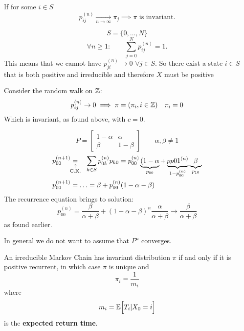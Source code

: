 \documentclass{article}
\begin{document}
\begin{proposition}
    If for some $i\in S$ \[
    p_{ij}^{(n)}\xrightarrow[n\rightarrow\infty]{}\pi_j\implies\pi\text{ is invariant.}
    \]
\end{proposition}
    \begin{proof2}
        \[S=\{0,\ldots,N\}\]
        \[\forall n\geqslant1:\qquad\sum_{j=0}^N p_{ij}^{(n)}=1. \]
        This means that we cannot have $p_{ji}^{(n)}\rightarrow 0$ $\forall j\in S$. So there exist a state $i \in S$ that is both positive and irreducible and therefore $X$ must be positive
    \end{proof2} 
\begin{example}
    Consider the random walk on $\mathbb{Z}$:
    \[p_{ij}^{(n)}\rightarrow0\implies\pi=(\pi_i,i\in\mathbb{Z})\quad\pi_i=0\]
    Which is invariant, as found above, with $c=0$.
\end{example}
\begin{example}
    \[
    P=\begin{bmatrix}
            1-\alpha & \alpha \\
            \beta & 1-\beta
        \end{bmatrix}\qquad\alpha,\beta\neq 1
    \]
    \begin{align*}
        p_{00}^{(n+1)}&\equalexpl{\text{C.K.}}\hspace{1em}\sum_{k\in S}p_{0k}^{(n)}p_{k0}=p_{00}^{(n)}\underbrace{(1-\alpha}_{p_{00}}+\underbrace{pp{01}^{(n)}}_{1-p_{00}^{(n)}}\underbrace{\beta}_{p_{10}}\\
        p_{00}^{(n+1)}&=\ldots=\beta+p_{00}^{(n)}(1-\alpha-\beta)
    \end{align*}
    The recurrence equation brings to solution:
    \[p_{00}^{(n)}=\frac{\beta}{\alpha+\beta}+(1-\alpha-\beta)^n\frac{\alpha}{\alpha+\beta}\rightarrow\frac{\beta}{\alpha+\beta}\]
    as found earlier.
\end{example}
In general we do not want to assume that $P^n$ converges.
\begin{theorem}
     An irreducible Markov Chain has invariant distribution $\pi$ if and only if it is positive recurrent, in which case $\pi$ is unique and 
        \begin{equation*}
            \pi_i = \frac{1}{m_i}
        \end{equation*}
        where 
        \begin{equation*}
            m_i = \mathbb{E}\Bigl[{T_i | X_0 = i}\Bigr]
        \end{equation*}
        is the \textbf{expected return time}. 
\end{theorem}
\end{document}

